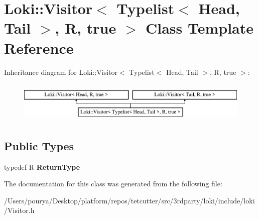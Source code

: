 \hypertarget{classLoki_1_1Visitor_3_01Typelist_3_01Head_00_01Tail_01_4_00_01R_00_01true_01_4}{}\section{Loki\+:\+:Visitor$<$ Typelist$<$ Head, Tail $>$, R, true $>$ Class Template Reference}
\label{classLoki_1_1Visitor_3_01Typelist_3_01Head_00_01Tail_01_4_00_01R_00_01true_01_4}
Inheritance diagram for Loki\+:\+:Visitor$<$ Typelist$<$ Head, Tail $>$, R, true $>$\+:\begin{figure}[H]
\begin{center}
\leavevmode
\includegraphics[height=1.978799cm]{classLoki_1_1Visitor_3_01Typelist_3_01Head_00_01Tail_01_4_00_01R_00_01true_01_4}
\end{center}
\end{figure}
\subsection*{Public Types}
\begin{DoxyCompactItemize}
\item 
\hypertarget{classLoki_1_1Visitor_3_01Typelist_3_01Head_00_01Tail_01_4_00_01R_00_01true_01_4_a1b7ab352dfe7b1a4427c34065dab5838}{}typedef R {\bfseries Return\+Type}\label{classLoki_1_1Visitor_3_01Typelist_3_01Head_00_01Tail_01_4_00_01R_00_01true_01_4_a1b7ab352dfe7b1a4427c34065dab5838}

\end{DoxyCompactItemize}


The documentation for this class was generated from the following file\+:\begin{DoxyCompactItemize}
\item 
/\+Users/pourya/\+Desktop/platform/repos/tetcutter/src/3rdparty/loki/include/loki/Visitor.\+h\end{DoxyCompactItemize}
